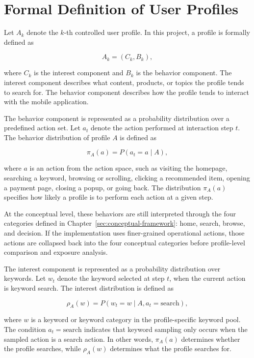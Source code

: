\section{Formal Definition of User Profiles}

Let \(A_k\) denote the \(k\)-th controlled user profile. In this project, a profile is formally defined as

\[
A_k = (C_k, B_k),
\]

where \(C_k\) is the interest component and \(B_k\) is the behavior component. The interest component describes what content, products, or topics the profile tends to search for. The behavior component describes how the profile tends to interact with the mobile application.

The behavior component is represented as a probability distribution over a predefined action set. Let \(a_t\) denote the action performed at interaction step \(t\). The behavior distribution of profile \(A\) is defined as

\[
\pi_A(a) = P(a_t = a \mid A),
\]

where \(a\) is an action from the action space, such as visiting the homepage, searching a keyword, browsing or scrolling, clicking a recommended item, opening a payment page, closing a popup, or going back. The distribution \(\pi_A(a)\) specifies how likely a profile is to perform each action at a given step.

At the conceptual level, these behaviors are still interpreted through the four categories defined in Chapter~\ref{sec:conceptual-framework}: home, search, browse, and decision. If the implementation uses finer-grained operational actions, those actions are collapsed back into the four conceptual categories before profile-level comparison and exposure analysis.

The interest component is represented as a probability distribution over keywords. Let \(w_t\) denote the keyword selected at step \(t\), when the current action is keyword search. The interest distribution is defined as

\[
\rho_A(w) = P(w_t = w \mid A, a_t = \text{search}),
\]

where \(w\) is a keyword or keyword category in the profile-specific keyword pool. The condition \(a_t = \text{search}\) indicates that keyword sampling only occurs when the sampled action is a search action. In other words, \(\pi_A(a)\) determines whether the profile searches, while \(\rho_A(w)\) determines what the profile searches for.

